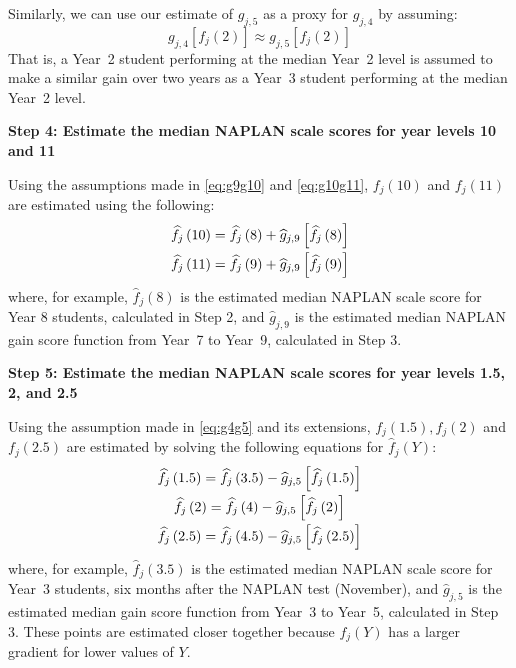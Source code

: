 Similarly, we can use our estimate of $g_{j,5}$ as a proxy for $g_{j,4}$ by assuming:
\begin{equation}
g_{j,4}\left[f_{j}\left(2\right)\right] \approx g_{j,5}\left[f_{j}\left(2\right)\right] \label{eq:g4g5}
\end{equation}
That is, a \mbox{Year 2} student performing at the median \mbox{Year 2} level is assumed to make a similar gain over two years as a \mbox{Year 3} student performing at the median \mbox{Year 2} level.

\vspace{9pt}
\textbf{Step 4: Estimate the median NAPLAN scale scores for year levels 10 and 11}
\nopagebreak

Using the assumptions made in \cref{eq:g9g10} and \cref{eq:g10g11}, $f_{j}(10)$ and $f_{j}(11)$ are estimated using the following:
\begin{equation} \begin{array}{c}
\widehat{f}_{j}\left(10\right) = \widehat{f}_{j}\left(8\right) + \widehat{g}_{j,9}\left[\widehat{f}_{j}\left(8\right)\right] \vspace{0.3em}\\
\widehat{f}_{j}\left(11\right) = \widehat{f}_{j}\left(9\right) + \widehat{g}_{j,9}\left[\widehat{f}_{j}\left(9\right)\right] 
\end{array} \end{equation}
where, for example, $\widehat{f}_{j}(8)$ is the estimated median NAPLAN scale score for Year 8 students, calculated in Step 2, and $\widehat{g}_{j,9}$ is the estimated median NAPLAN gain score function from \mbox{Year 7} to \mbox{Year 9}, calculated in Step 3.

\textbf{Step 5: Estimate the median NAPLAN scale scores for year levels 1.5, 2, and 2.5}
\nopagebreak

Using the assumption made in \cref{eq:g4g5} and its extensions, $f_{j}(1.5),f_{j}(2)$ and $f_{j}(2.5)$ are estimated by solving the following equations for $\widehat{f}_{j}\left(Y\right)$:
\begin{equation} \begin{array}{c}
\widehat{f}_{j}\left(1.5\right) = \widehat{f}_{j}\left(3.5\right) - \widehat{g}_{j,5}\left[\widehat{f}_{j}\left(1.5\right)\right] \vspace{0.3em}\\
\widehat{f}_{j}\left(2\right) = \widehat{f}_{j}\left(4\right) - \widehat{g}_{j,5}\left[\widehat{f}_{j}\left(2\right)\right] \vspace{0.3em}\\
\widehat{f}_{j}\left(2.5\right) = \widehat{f}_{j}\left(4.5\right) - \widehat{g}_{j,5}\left[\widehat{f}_{j}\left(2.5\right)\right]
\end{array} \end{equation}
where, for example, $\widehat{f}_{j}(3.5)$ is the estimated median NAPLAN scale score for \mbox{Year 3} students, six months after the NAPLAN test (November), and $\widehat{g}_{j,5}$ is the estimated median gain score function from \mbox{Year 3} to \mbox{Year 5}, calculated in Step 3. These points are estimated closer together because $f_{j}(Y)$ has a larger gradient for lower values of $Y$.

